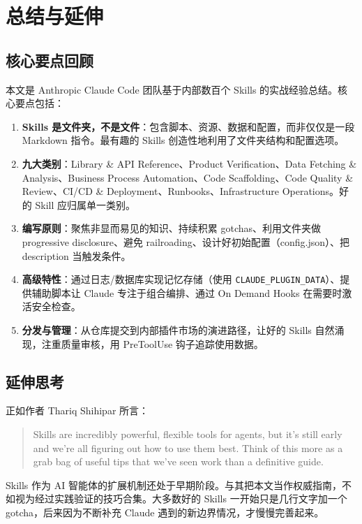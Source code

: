 \section{总结与延伸}

\subsection{核心要点回顾}

本文是 Anthropic Claude Code 团队基于内部数百个 Skills 的实战经验总结。核心要点包括：

\begin{enumerate}
    \item \textbf{Skills 是文件夹，不是文件}：包含脚本、资源、数据和配置，而非仅仅是一段 Markdown 指令。最有趣的 Skills 创造性地利用了文件夹结构和配置选项。
    \item \textbf{九大类别}：Library \& API Reference、Product Verification、Data Fetching \& Analysis、Business Process Automation、Code Scaffolding、Code Quality \& Review、CI/CD \& Deployment、Runbooks、Infrastructure Operations。好的 Skill 应归属单一类别。
    \item \textbf{编写原则}：聚焦非显而易见的知识、持续积累 gotchas、利用文件夹做 progressive disclosure、避免 railroading、设计好初始配置（config.json）、把 description 当触发条件。
    \item \textbf{高级特性}：通过日志/数据库实现记忆存储（使用 \texttt{CLAUDE\_PLUGIN\_DATA}）、提供辅助脚本让 Claude 专注于组合编排、通过 On Demand Hooks 在需要时激活安全检查。
    \item \textbf{分发与管理}：从仓库提交到内部插件市场的演进路径，让好的 Skills 自然涌现，注重质量审核，用 PreToolUse 钩子追踪使用数据。
\end{enumerate}

\subsection{延伸思考}

正如作者 Thariq Shihipar 所言：

\begin{quote}
Skills are incredibly powerful, flexible tools for agents, but it's still early and we're all figuring out how to use them best. Think of this more as a grab bag of useful tips that we've seen work than a definitive guide.
\end{quote}

Skills 作为 AI 智能体的扩展机制还处于早期阶段。与其把本文当作权威指南，不如视为经过实践验证的技巧合集。大多数好的 Skills 一开始只是几行文字加一个 gotcha，后来因为不断补充 Claude 遇到的新边界情况，才慢慢完善起来。

